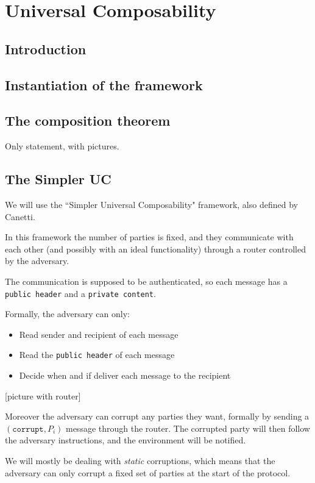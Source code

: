 \chapter{Universal Composability}

\section{Introduction}

\section{Instantiation of the framework}

\section{The composition theorem}
Only statement, with pictures.

\section{The Simpler UC}
We will use the ``Simpler Universal Composability" framework, also defined by Canetti.

In this framework the number of parties is fixed, and they communicate with each other (and possibly with an ideal functionality) through a router controlled by the adversary.

The communication is supposed to be authenticated, so each message has a \texttt{public header} and a \texttt{private content}.

Formally, the adversary can only:
\begin{itemize}
    \item Read sender and recipient of each message
    \item Read the \texttt{public header} of each message
    \item Decide when and if deliver each message to the recipient
\end{itemize}

[picture with router]

Moreover the adversary can corrupt any parties they want, formally by sending a $(\texttt{corrupt}, P_i)$ message through the router. The corrupted party will then follow the adversary instructions, and the environment will be notified.

We will mostly be dealing with \emph{static} corruptions, which means that the adversary can only corrupt a fixed set of parties at the start of the protocol.

